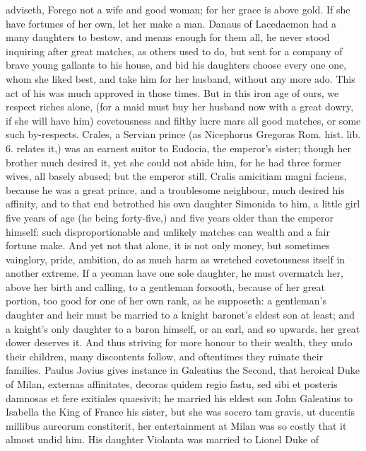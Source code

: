 {adviseth, Forego not a wife and good woman; for her grace is above
gold. If she have fortunes of her own, let her make a man. Danaus of
Lacedaemon had a many daughters to bestow, and means enough for them
all, he never stood inquiring after great matches, as others used to
do, but sent for a company of brave young gallants to his house,
and bid his daughters choose every one one, whom she liked best, and
take him for her husband, without any more ado. This act of his was
much approved in those times. But in this iron age of ours, we respect
riches alone, (for a maid must buy her husband now with a great dowry,
if she will have him) covetousness and filthy lucre mars all good
matches, or some such by-respects. Crales, a Servian prince (as
Nicephorus Gregoras Rom. hist. lib. 6. relates it,) was an earnest
suitor to Eudocia, the emperor's sister; though her brother much
desired it, yet she could not abide him, for he had three former
wives, all basely abused; but the emperor still, Cralis amicitiam magni
faciens, because he was a great prince, and a troublesome neighbour,
much desired his affinity, and to that end betrothed his own daughter
Simonida to him, a little girl five years of age (he being forty-five,)
and five years older than the emperor himself: such
disproportionable and unlikely matches can wealth and a fair fortune
make. And yet not that alone, it is not only money, but sometimes
vainglory, pride, ambition, do as much harm as wretched covetousness
itself in another extreme. If a yeoman have one sole daughter, he must
overmatch her, above her birth and calling, to a gentleman forsooth,
because of her great portion, too good for one of her own rank, as he
supposeth: a gentleman's daughter and heir must be married to a knight
baronet's eldest son at least; and a knight's only daughter to a baron
himself, or an earl, and so upwards, her great dower deserves it. And
thus striving for more honour to their wealth, they undo their
children, many discontents follow, and oftentimes they ruinate their
families. Paulus Jovius gives instance in Galeatius the Second,
that heroical Duke of Milan, externas affinitates, decoras quidem regio
fastu, sed sibi et posteris damnosas et fere exitiales quaesivit; he
married his eldest son John Galeatius to Isabella the King of France
his sister, but she was socero tam gravis, ut ducentis millibus
aureorum constiterit, her entertainment at Milan was so costly that it
almost undid him. His daughter Violanta was married to Lionel Duke of
}
